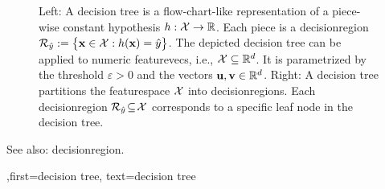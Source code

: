 {{\begin{figure}[H]
\begin{minipage}{.45\textwidth}
\end{minipage}
	\caption{Left: A decision tree is a flow-chart-like representation of a piece-wise 
	    constant \gls{hypothesis} $h: \mathcal{X} \rightarrow \mathbb{R}$.  Each piece is a \gls{decisionregion} $\mathcal{R}_{\hat{y}} := \big\{ {\bf x} \in  \mathcal{X}: h({\bf x}) = \hat{y} \big\}$. 
		The depicted decision tree can be applied to numeric \glspl{featurevec}, i.e., $\mathcal{X} \subseteq \mathbb{R}^{d}$. It is  parametrized by the threshold $\varepsilon>0$ and the vectors ${\bf u}, {\bf v} \in \mathbb{R}^{d}$. 
		Right: A decision tree partitions  
		the \gls{featurespace} $\mathcal{X}$ into \glspl{decisionregion}. Each \gls{decisionregion}  
		$\mathcal{R}_{\hat{y}} \!\subseteq\!\mathcal{X}$ corresponds to a specific leaf node in the decision tree.}
	\label{fig_decision_tree_dict}
\end{figure} 
		See also: \gls{decisionregion}.
	  },first={decision tree},
      text={decision tree} }



